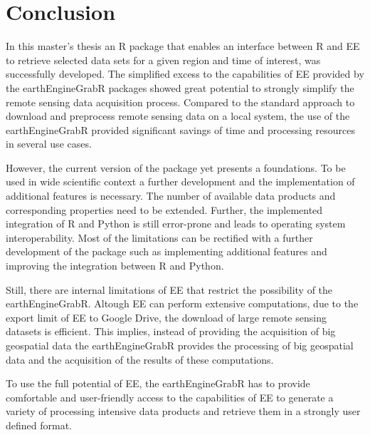 
\chapter{Conclusion}


In this master's thesis an R package that enables an interface between R and EE to retrieve selected data sets for a given region and time of interest, was successfully developed. The simplified excess to the capabilities of EE provided by the earthEngineGrabR packages showed great potential to strongly simplify the remote sensing data acquisition process. Compared to the standard approach to download and preprocess remote sensing data on a local system, the use of the earthEngineGrabR provided significant savings of time and processing resources in several use cases. 

However, the current version of the package yet presents a foundations. To be used in wide scientific context a further development and the implementation of additional features is necessary. 
The number of available data products and corresponding properties need to be extended.
Further, the implemented integration of R and Python is still error-prone and leads to operating system interoperability.  
Most of the limitations can be rectified with a further development of the package such as implementing additional features and improving the integration between R and Python.

Still, there are internal limitations of EE that restrict the possibility of the earthEngineGrabR. Altough EE can perform extensive computations, due to the export limit of EE to Google Drive, the download of large remote sensing datasets is efficient. This implies, instead of providing the acquisition of big geospatial data the earthEngineGrabR provides the processing of big geospatial data and the acquisition of the results of these computations.

To use the full potential of EE, the earthEngineGrabR has to provide comfortable and user-friendly access to the capabilities of EE to generate a variety of processing intensive data products and retrieve them in a strongly user defined format.



